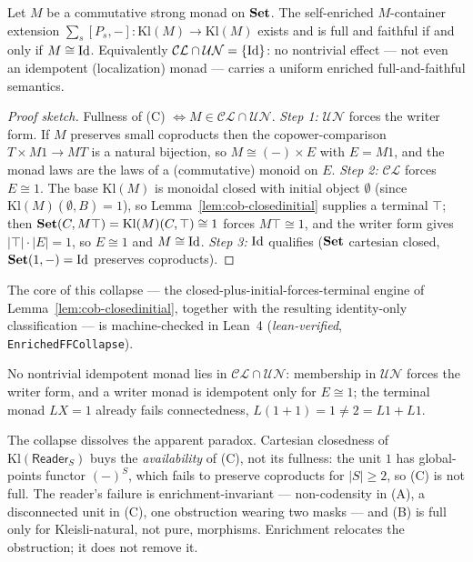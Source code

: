 \begin{theorem}[$\mathcal{CL}\cap\mathcal{UN}=\{\Id\}$; \emph{proved}, core \emph{lean-verified}]\label{thm:cob-collapse}
Let $M$ be a commutative strong monad on $\mathbf{Set}$. The self-enriched $M$-container
extension $\sum_s[P_s,-]\colon\mathrm{Kl}(M)\to\mathrm{Kl}(M)$ exists and is full
and faithful if and only if $M\cong\mathrm{Id}$. Equivalently $\mathcal{CL}\cap\mathcal{UN}=\{\Id\}$: no nontrivial
effect --- not even an idempotent (localization) monad --- carries a uniform
enriched full-and-faithful semantics.
\end{theorem}

\begin{proof}[Proof sketch]
Fullness of (C) $\iff M\in\mathcal{CL}\cap\mathcal{UN}$. \emph{Step 1:} $\mathcal{UN}$ forces the writer
form. If $M$ preserves small coproducts then the copower-comparison
$T\times M1\to MT$ is a natural bijection, so $M\cong(-)\times E$ with $E=M1$, and
the monad laws are the laws of a (commutative) monoid on $E$. \emph{Step 2:} $\mathcal{CL}$
forces $E\cong1$. The base $\mathrm{Kl}(M)$ is monoidal closed with initial object
$\emptyset$ (since $\mathrm{Kl}(M)(\emptyset,B)=1$), so
Lemma~\ref{lem:cob-closedinitial} supplies a terminal $\top$; then
$\mathbf{Set}(C,M\top)=\mathrm{Kl}(M)(C,\top)\cong1$ forces $M\top\cong1$, and the writer
form gives $|\top|\cdot|E|=1$, so $E\cong1$ and $M\cong\mathrm{Id}$. \emph{Step 3:} $\mathrm{Id}$
qualifies ($\mathbf{Set}$ cartesian closed, $\mathbf{Set}(1,-)=\mathrm{Id}$ preserves coproducts).
\end{proof}

The core of this collapse --- the closed-plus-initial-forces-terminal engine of
Lemma~\ref{lem:cob-closedinitial}, together with the resulting
identity-only classification --- is machine-checked in Lean~4
(\emph{lean-verified}, \texttt{EnrichedFFCollapse}).

\begin{corollary}\label{cor:cob-noidem}
No nontrivial idempotent monad lies in $\mathcal{CL}\cap\mathcal{UN}$: membership in $\mathcal{UN}$ forces the
writer form, and a writer monad is idempotent only for $E\cong1$; the terminal
monad $LX=1$ already fails connectedness, $L(1+1)=1\neq2=L1+L1$.
\end{corollary}

\begin{remark}\label{rem:cob-reader}
The collapse dissolves the apparent paradox. Cartesian closedness of
$\mathrm{Kl}(\mathsf{Reader}_S)$ buys the \emph{availability} of (C), not its
fullness: the unit $1$ has global-points functor $(-)^S$, which fails to preserve
coproducts for $|S|\ge2$, so (C) is not full. The reader's failure is
enrichment-invariant --- non-codensity in (A), a disconnected unit in (C), one
obstruction wearing two masks --- and (B) is full only for Kleisli-natural, not
pure, morphisms. Enrichment relocates the obstruction; it does not remove it.
\end{remark}

